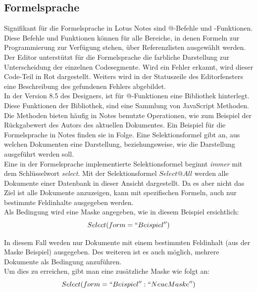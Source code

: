 \subsection{Formelsprache}
\label{sec:4designelemente}

Signifikant für die Formelsprache in Lotus Notes sind @-Befehle und -Funktionen. Diese Befehle und Funktionen können für alle Bereiche, in denen
Formeln zur Programmierung zur Verfügung stehen, über Referenzlisten ausgewählt werden. Der Editor unterstützt für die \linebreak Formelsprache die farbliche
Darstellung zur Unterscheidung der einzelnen Codesegmente. Wird ein Fehler erkannt, wird dieser Code-Teil in Rot dargestellt. Weiters wird in der Statuszeile
des Editorfensters eine Beschreibung des gefundenen Fehlers abgebildet\cite{mann}.\\
In der Version 8.5 des Designers, ist für @-Funktionen eine Bibliothek hinterlegt. Diese \linebreak Funktionen der Bibliothek, sind eine Sammlung von JavaScript
Methoden. Die Methoden \linebreak bieten häufig in Notes benutzte Operationen, wie zum Beispiel der Rückgabewert des Autors des aktuellen Dokumentes\cite{donelly}.\newline 
Ein Beispiel für die Formelsprache in Notes finden sie in Folge.
Eine Selektionsformel gibt an, aus welchen Dokumenten eine Darstellung, beziehungsweise, wie die Darstellung ausgeführt werden soll.\\
Eine in der Formelsprache implementierte Selektionsformel beginnt \textit{immer} mit dem Schlüsselwort \textit{select}. 
Mit der Selektionsformel $ Select @ All$ werden alle Dokumente einer Datenbank in dieser Ansicht dargestellt. 
Da es aber nicht das Ziel ist alle Dokumente anzuzeigen, kann mit spezifischen Formeln, auch nur bestimmte Feldinhalte ausgegeben werden.\\
Als Bedingung wird eine Maske angegeben, wie in diesem Beispiel ersichtlich:
\begin{equation}
Select (form=``Beispiel'')
\end{equation} 

In diesem Fall werden nur Dokumente mit einem bestimmten Feldinhalt (aus der Maske Beispiel) ausgegeben.
Des weiteren ist es auch möglich, mehrere Dokumente als Bedingung anzuführen. \\
Um dies zu erreichen, gibt man eine zusätzliche Maske wie folgt an:
\begin{equation}
 Select (form=``Beispiel'':``NeueMaske'')
\end{equation}


